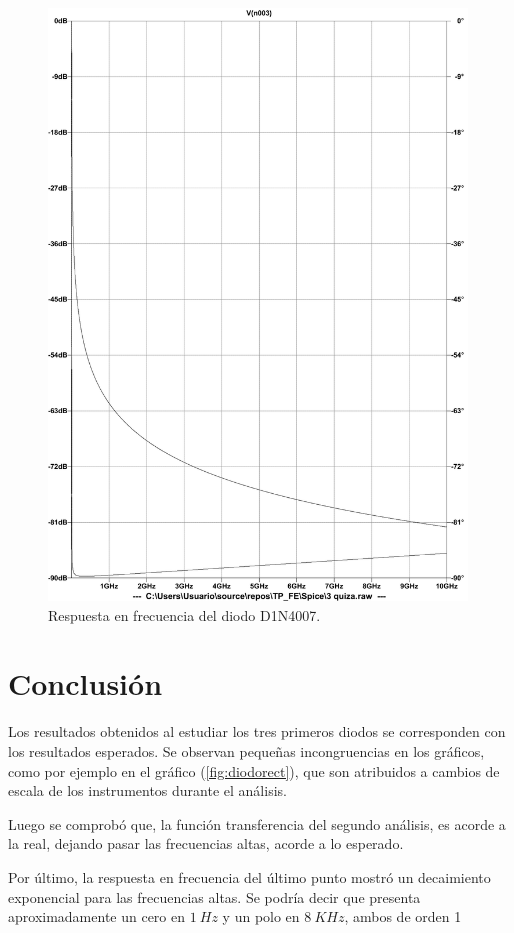 \documentclass[a4paper]{article}
\begin{document}
\begin{figure}[H]
	\centering
	\includegraphics[width=0.99\textwidth]{RtaF3}	
	\caption{Respuesta en frecuencia del diodo D1N4007.}
	\label{fig:rtaf}
\end{figure}

\section*{Conclusión}

Los resultados obtenidos al estudiar los tres primeros diodos se corresponden con los resultados esperados. Se observan pequeñas incongruencias en los gráficos, como por ejemplo en el gráfico (\ref{fig:diodorect}), que son atribuidos a cambios de escala de los instrumentos durante el análisis.

Luego se comprobó que, la función transferencia del segundo análisis, es acorde a la real, dejando pasar las frecuencias altas, acorde a lo esperado.

Por último, la respuesta en frecuencia del último punto mostró un decaimiento exponencial para las frecuencias altas. Se podría decir que presenta aproximadamente un cero en $1 \ Hz$ y un polo en $8 \ KHz$, ambos de orden 1
\end{document}
